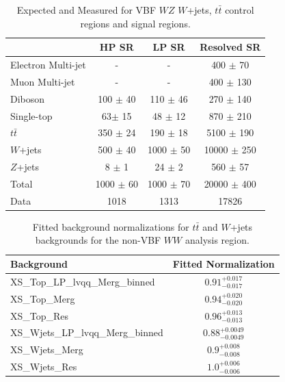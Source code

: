 \begin{table}
\begin{tabular}{|l|c|c|c|}
\hline
	  &	 HP SR &	 LP SR &	Resolved SR \\\hline 
	Electron Multi-jet &	- &	- &	400 $\pm$ 70\\\hline 
	Muon Multi-jet &	- &	- &	400 $\pm$ 130 \\\hline 
	Diboson &	100 $\pm$ 40 &	110 $\pm$ 46 &	270 $\pm$ 140 \\\hline 
	Single-top &	63$\pm$ 15&	48 $\pm$ 12 &	870 $\pm$ 210 \\\hline 
	$t\bar{t}$ &	350 $\pm$ 24 &	190 $\pm$ 18 &	5100 $\pm$ 190 \\\hline 
	$W$+jets &	500 $\pm$ 40 &	1000 $\pm$ 50 &	10000 $\pm$ 250 \\\hline 
	$Z$+jets &	8 $\pm$ 1 &	24 $\pm$ 2 &	560 $\pm$ 57 \\\hline 
	Total &	1000 $\pm$ 60 &	1000 $\pm$ 70 &	20000 $\pm$ 400 \\\hline 
	Data &	1018 &	1313 &	17826 \\\hline 
\end{tabular}
\caption{Expected and Measured for VBF $WZ$ $W$+jets, $t\bar{t}$ control regions and signal regions.}
\label{tbl:hvwzvbf_yields}

\end{table}

\begin{table}
\begin{tabular}{|l|c|}
\hline
Background & Fitted Normalization \\\hline
XS\_Top\_LP\_lvqq\_Merg\_binned & $0.91^{+0.017}_{-0.017}$ \\\hline
XS\_Top\_Merg & $0.94^{+0.020}_{-0.020}$ \\\hline
XS\_Top\_Res & $0.96^{+0.013}_{-0.013}$ \\\hline
XS\_Wjets\_LP\_lvqq\_Merg\_binned & $0.88^{+0.0049}_{-0.0049}$ \\\hline
XS\_Wjets\_Merg & $0.9^{+0.008}_{-0.008}$ \\\hline
XS\_Wjets\_Res & $1.0^{+0.006}_{-0.006}$ \\\hline

\end{tabular}
\caption{Fitted background normalizations for $t\bar{t}$ and $W$+jets backgrounds for the non-VBF $WW$ analysis region.}
\label{tbl:hvtww_norm}
\end{table}



